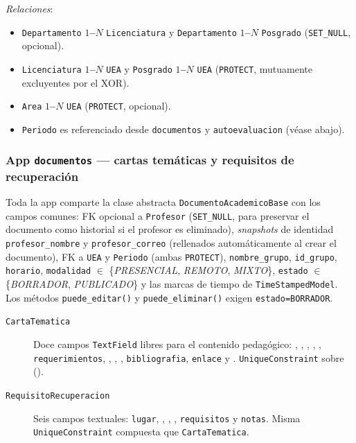 \emph{Relaciones}:
\begin{itemize}
    \item \texttt{Departamento} \textbf{$1$--$N$} \texttt{Licenciatura} y \texttt{Departamento} \textbf{$1$--$N$} \texttt{Posgrado} (\texttt{SET\_NULL}, opcional).
    \item \texttt{Licenciatura} \textbf{$1$--$N$} \texttt{UEA} y \texttt{Posgrado} \textbf{$1$--$N$} \texttt{UEA} (\texttt{PROTECT}, mutuamente excluyentes por el XOR).
    \item \texttt{Area} \textbf{$1$--$N$} \texttt{UEA} (\texttt{PROTECT}, opcional).
    \item \texttt{Periodo} es referenciado desde \texttt{documentos} y \texttt{autoevaluacion} (véase abajo).
\end{itemize}

\subsubsection*{App \texttt{documentos} --- cartas temáticas y requisitos de recuperación}

Toda la app comparte la clase abstracta \texttt{DocumentoAcademicoBase} con los campos comunes: FK opcional a \texttt{Profesor} (\texttt{SET\_NULL}, para preservar el documento como historial si el profesor es eliminado), \emph{snapshots} de identidad \texttt{profesor\_nombre} y \texttt{profesor\_correo} (rellenados automáticamente al crear el documento), FK a \texttt{UEA} y \texttt{Periodo} (ambas \texttt{PROTECT}), \texttt{nombre\_grupo}, \texttt{id\_grupo}, \texttt{horario}, \texttt{modalidad} $\in$ \{\emph{PRESENCIAL}, \emph{REMOTO}, \emph{MIXTO}\}, \texttt{estado} $\in$ \{\emph{BORRADOR}, \emph{PUBLICADO}\} y las marcas de tiempo de \texttt{TimeStampedModel}. Los métodos \texttt{puede\_editar()} y \texttt{puede\_eliminar()} exigen \texttt{estado=BORRADOR}.

\begin{description}
    \item[\texttt{CartaTematica}] Doce campos \texttt{TextField} libres para el contenido pedagógico: , , , , , \texttt{requerimientos}, , , , \texttt{bibliografia}, \texttt{enlace} y . \texttt{UniqueConstraint}  sobre ().
    \item[\texttt{RequisitoRecuperacion}] Seis campos textuales: \texttt{lugar}, , , , \texttt{requisitos} y \texttt{notas}. Misma \texttt{UniqueConstraint} compuesta que \texttt{CartaTematica}.
\end{description}

